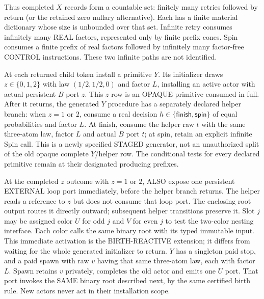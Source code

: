 \documentclass{article}
\begin{document}
Thus completed $X$ records form a countable set: finitely many retries followed by return (or the retained zero nullary alternative). Each has a finite material dictionary whose size is unbounded over that set. Infinite retry consumes infinitely many REAL factors, represented only by finite prefix cones. Spin consumes a finite prefix of real factors followed by infinitely many factor-free CONTROL instructions. These two infinite paths are not identified.

At each returned child token install a primitive $Y$. Its initializer draws $z\in\{0,1,2\}$ with law $(1/2,1/2,0)$ and factor $L$, installing an active actor with actual persistent $B$ port $z$. This $z$ row is an OPAQUE primitive consumed in full. After it returns, the generated $Y$ procedure has a separately declared helper branch: when $z=1$ or $2$, consume a real decision $h\in\{\mathsf{finish},\mathsf{spin}\}$ of equal probabilities and factor $L$. At finish, consume the helper raw $t$ with the same three-atom law, factor $L$ and actual $B$ port $t$; at spin, retain an explicit infinite Spin call. This is a newly specified STAGED generator, not an unauthorized split of the old opaque complete $Y$/helper row. The conditional tests for every declared primitive remain at their designated producing prefixes.

At the completed $z$ outcome with $z=1$ or $2$, ALSO expose one persistent EXTERNAL loop port immediately, before the helper branch returns. The helper reads a reference to $z$ but does not consume that loop port. The enclosing root output routes it directly outward; subsequent helper transitions preserve it. Slot $j$ may be assigned color $U$ for odd $j$ and $V$ for even $j$ to test the two-color nesting interface. Each color calls the same binary root with its typed immutable input. This immediate activation is the BIRTH-REACTIVE extension; it differs from waiting for the whole generated initializer to return. $Y$ has a singleton paid stop, and a paid spawn with raw $v$ having that same three-atom law, each with factor $L$. Spawn retains $v$ privately, completes the old actor and emits one $U$ port. That port invokes the SAME binary root described next, by the same certified birth rule. New actors never act in their installation scope.
\end{document}
